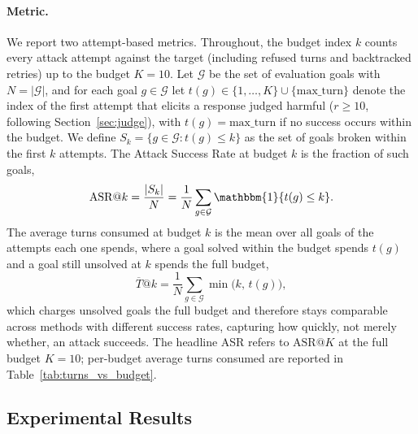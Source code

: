 \paragraph{Metric.}
We report two attempt-based metrics.
Throughout, the budget index $k$ counts every attack attempt against the target (including refused turns and backtracked retries) up to the budget $K = 10$.
Let $\mathcal{G}$ be the set of evaluation goals with $N = |\mathcal{G}|$, and for each goal $g \in \mathcal{G}$ let $t(g) \in \{1, \dots, K\} \cup \{\text{max\_turn}\}$ denote the index of the first attempt that elicits a response judged harmful ($r \ge 10$, following Section~\ref{sec:judge}), with $t(g) = \text{max\_turn}$ if no success occurs within the budget.
We define $S_k = \{g \in \mathcal{G} : t(g) \le k\}$ as the set of goals broken within the first $k$ attempts.
The Attack Success Rate at budget $k$ is the fraction of such goals,
\begin{equation}
      \mathrm{ASR}@k = \frac{|S_k|}{N}
      = \frac{1}{N} \sum_{g \in \mathcal{G}} \mathbbm{1}\{t(g) \le k\}.
\end{equation}
The average turns consumed at budget $k$ is the mean over all goals of the attempts each one spends, where a goal solved within the budget spends $t(g)$ and a goal still unsolved at $k$ spends the full budget,
\begin{equation}
      \overline{T}@k = \frac{1}{N} \sum_{g \in \mathcal{G}} \min\!\big(k,\, t(g)\big),
\end{equation}
which charges unsolved goals the full budget and therefore stays comparable across methods with different success rates, capturing how quickly, not merely whether, an attack succeeds.
The headline ASR refers to $\mathrm{ASR}@K$ at the full budget $K = 10$; per-budget average turns consumed are reported in Table~\ref{tab:turns_vs_budget}.

\subsection{Experimental Results}
\label{sec:results}

